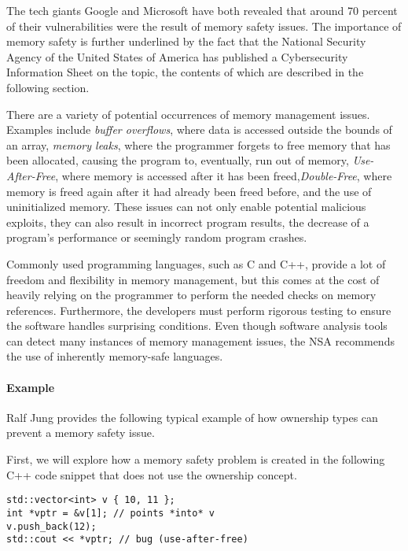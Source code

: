 \documentclass[sigplan,11pt,nonacm]{acmart}
\begin{document}
The tech giants Google \cite{google-memory-safety} and Microsoft \cite{microsoft-memory-safety} have both revealed that around 70 percent of their vulnerabilities were the result of memory safety issues.
The importance of memory safety is further underlined by the fact that the National Security Agency of the United States of America has published a Cybersecurity Information Sheet \cite{nsa-memory-safety} on the topic, the contents of which are described in the following section.

There are a variety of potential occurrences of memory management issues.
Examples include \emph{buffer overflows}, where data is accessed outside the bounds of an array, \emph{memory leaks}, where the programmer forgets to free memory that has been allocated, causing the program to, eventually, run out of memory, \emph{Use-After-Free}, where memory is accessed after it has been freed,\emph{Double-Free}, where memory is freed again after it had already been freed before, and the use of uninitialized memory.
These issues can not only enable potential malicious exploits, they can also result in incorrect program results, the decrease of a program's performance or seemingly random program crashes.

Commonly used programming languages, such as C and C++, provide a lot of freedom and flexibility in memory management, but this comes at the cost of heavily relying on the programmer to perform the needed checks on memory references.
Furthermore, the developers must perform rigorous testing to ensure the software handles surprising conditions.
Even though software analysis tools can detect many instances of memory management issues, the NSA recommends the use of inherently memory-safe languages.


\paragraph{Example}

Ralf Jung \cite{understanding-evolving-rust} provides the following typical example of how ownership types can prevent a memory safety issue.

First, we will explore how a memory safety problem is created in the following C++ code snippet that does not use the ownership concept.

\begin{lstlisting}
std::vector<int> v { 10, 11 };
int *vptr = &v[1]; // points *into* v
v.push_back(12);
std::cout << *vptr; // bug (use-after-free)
\end{lstlisting}
\end{document}
